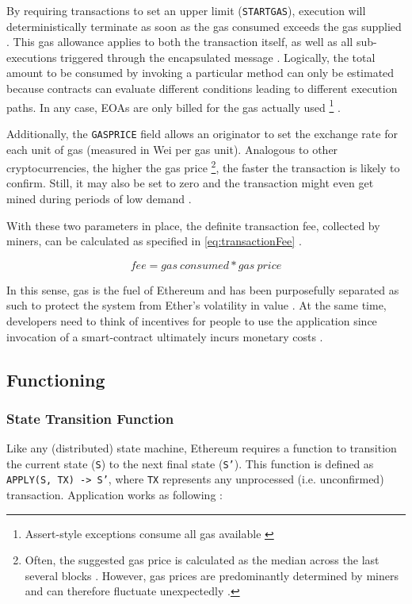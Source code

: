 By requiring transactions to set an upper limit (\texttt{STARTGAS}), execution will deterministically terminate as soon as the gas consumed exceeds the gas supplied \cite[p.~33]{Antonopoulos.2018}. This gas allowance applies to both the transaction itself, as well as all sub-executions triggered through the encapsulated message \cite[p.~19]{ethereumWhitepaperGitHub}. Logically, the total amount to be consumed by invoking a particular method can only be estimated because contracts can evaluate different conditions leading to different execution paths. In any case, \acp{EOA} are only billed for the gas actually used \footnote{Assert-style exceptions consume all gas available \cite[p.~75]{solidityDocs}} \cite[p.~154]{Antonopoulos.2018}. 

Additionally, the \texttt{GASPRICE} field allows an originator to set the exchange rate for each unit of gas (measured in Wei per gas unit). Analogous to other cryptocurrencies, the higher the gas price \footnote{Often, the suggested gas price is calculated as the median across the last several blocks \cite[p.~153]{Antonopoulos.2018}. However, gas prices are predominantly determined by miners and can therefore fluctuate unexpectedly \cite[p.~54]{Antonopoulos.2018}.}, the faster the transaction is likely to confirm. Still, it may also be set to zero and the transaction might even get mined during periods of low demand \cite[p.~153]{Antonopoulos.2018}. 

With these two parameters in place, the definite transaction fee, collected by miners, can be calculated as specified in \autoref{eq:transactionFee} \cite[p.~53]{Antonopoulos.2018} \cite[p.~20]{ethereumWhitepaperGitHub}.

\begin{equation}
\label{eq:transactionFee}
fee = gas\ consumed * gas\ price
\end{equation}

In this sense, gas is the fuel of Ethereum and has been purposefully separated as such to protect the system from Ether's volatility in value \cite[p.~152]{Antonopoulos.2018}. At the same time, developers need to think of incentives for people to use the application since invocation of a smart-contract ultimately incurs monetary costs \cite[p.~4]{blockchainTechnologyGrowth}. 

\subsection{Functioning}
\subsubsection{State Transition Function}
\label{sec:stateTransition}
Like any (distributed) state machine, Ethereum requires a function to transition the current state (\texttt{S}) to the next final state (\texttt{S'}). This function is defined as \texttt{APPLY(S, TX)~->~S'}, where \texttt{TX} represents any unprocessed (i.e. unconfirmed) transaction. Application works as following \cite[p.~20]{ethereumWhitepaperGitHub}:  


